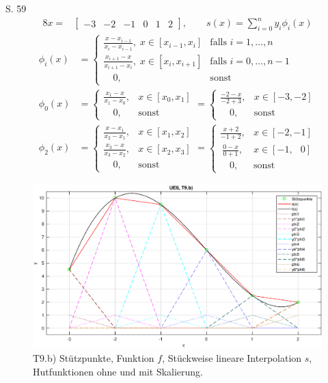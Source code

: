\documentclass[10pt,a4paper]{article}
\begin{document}
	S. 59
	\begin{alignat*}{8}
	x =& \begin{bmatrix}-3 & -2 & -1 &0& 1& 2 \end{bmatrix}, \qquad s(x)=\sum_{i=0}^{n}y_i\phi_i(x)
	\end{alignat*}
	\begin{align*}
	\phi_i(x) &= \begin{cases}
	\frac{x-x_{i-1}}{x_i-x_{i-1}}, \; x \in [x_{i-1}, x_i] & \text{falls } i=1,\dots, n\\
	\frac{x_{i+1}-x}{x_{i+1}-x_i}, \; x \in [x_i, x_{i+1}] & \text{falls } i=0,\dots, n-1\\
	\quad 0, & \text{sonst}
	\end{cases} \\
	\phi_0(x) &= \begin{cases}
	\frac{x_{1}-x}{x_{1}-x_0}, & x \in [x_0, x_{1}] \\
	\quad\! 0, & \text{sonst}
	\end{cases} =
	\begin{cases}
	\frac{-2-x}{-2+3}, & x \in [-3, -2] \\
	\quad\! 0, & \text{sonst}
	\end{cases}
	\\
	\phi_2(x) &= \begin{cases}
	\frac{x-x_{1}}{x_2-x_{1}}, & x \in [x_{1}, x_2] \\
	\frac{x_{3}-x}{x_{3}-x_2}, & x \in [x_2, x_{3}] \\
	\quad 0, & \text{sonst}
	\end{cases}
	= \begin{cases}
	\frac{x+2}{-1+2}, & x \in [-2, -1]\\
	\:\frac{0-x}{0+1}, & x \in [-1, \;\;\,0] \\
	\quad 0, & \text{sonst}
	\end{cases}
	\end{align*}
	\begin{figure}[htbp]
		\centering
		\includegraphics[width=1.0\textwidth]{T9b}
		\caption{T9.b) Stützpunkte, Funktion $f$, Stückweise lineare Interpolation $s$, Hutfunktionen ohne und mit Skalierung.}
	\end{figure}
	
\end{document}
